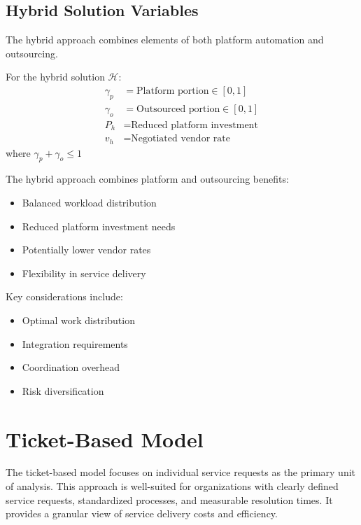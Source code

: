 \documentclass[12pt,a4paper]{article}
\newenvironment{definition}[1]
{\begin{mdframed}[style=definitionstyle,frametitle={Definition: #1}]}
{\end{mdframed}}
\newenvironment{explanation}
{\begin{mdframed}[style=explanationstyle,frametitle={Explanation}]}
{\end{mdframed}}
\begin{document}
\subsection{Hybrid Solution Variables}
The hybrid approach combines elements of both platform automation and outsourcing.

\begin{definition}{Hybrid Variables}
For the hybrid solution $\mathcal{H}$:
\begin{align*}
    \gamma_p &= \text{Platform portion} \in [0,1] \\
    \gamma_o &= \text{Outsourced portion} \in [0,1] \\
    P_h &= \text{Reduced platform investment} \\
    v_h &= \text{Negotiated vendor rate}
\end{align*}
where $\gamma_p + \gamma_o \leq 1$
\end{definition}

\begin{explanation}
The hybrid approach combines platform and outsourcing benefits:
\begin{itemize}
    \item Balanced workload distribution
    \item Reduced platform investment needs
    \item Potentially lower vendor rates
    \item Flexibility in service delivery
\end{itemize}

Key considerations include:
\begin{itemize}
    \item Optimal work distribution
    \item Integration requirements
    \item Coordination overhead
    \item Risk diversification
\end{itemize}
\end{explanation}

\section{Ticket-Based Model}
The ticket-based model focuses on individual service requests as the primary unit of analysis. This approach is well-suited for organizations with clearly defined service requests, standardized processes, and measurable resolution times. It provides a granular view of service delivery costs and efficiency.
\end{document}
